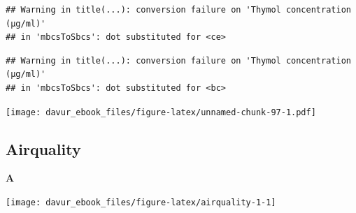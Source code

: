 \documentclass[]{book}
\newenvironment{Shaded}{\begin{snugshade}}{\end{snugshade}}
\newcommand{\DataTypeTok}[1]{\textcolor[rgb]{0.13,0.29,0.53}{#1}}
\newcommand{\DecValTok}[1]{\textcolor[rgb]{0.00,0.00,0.81}{#1}}
\newcommand{\KeywordTok}[1]{\textcolor[rgb]{0.13,0.29,0.53}{\textbf{#1}}}
\newcommand{\NormalTok}[1]{#1}
\newcommand{\OperatorTok}[1]{\textcolor[rgb]{0.81,0.36,0.00}{\textbf{#1}}}
\newcommand{\StringTok}[1]{\textcolor[rgb]{0.31,0.60,0.02}{#1}}
\begin{document}
\begin{verbatim}
## Warning in title(...): conversion failure on 'Thymol concentration (μg/ml)'
## in 'mbcsToSbcs': dot substituted for <ce>
\end{verbatim}

\begin{verbatim}
## Warning in title(...): conversion failure on 'Thymol concentration (μg/ml)'
## in 'mbcsToSbcs': dot substituted for <bc>
\end{verbatim}

\begin{Shaded}
\end{Shaded}

\texttt{[image: davur\_ebook\_files/figure-latex/unnamed-chunk-97-1.pdf]}

\hypertarget{airquality-1}{%
\subsection{Airquality}\label{airquality-1}}

\textbf{A}

\begin{Shaded}
\end{Shaded}

\begin{center}\texttt{[image: davur\_ebook\_files/figure-latex/airquality-1-1]} \end{center}
\end{document}
